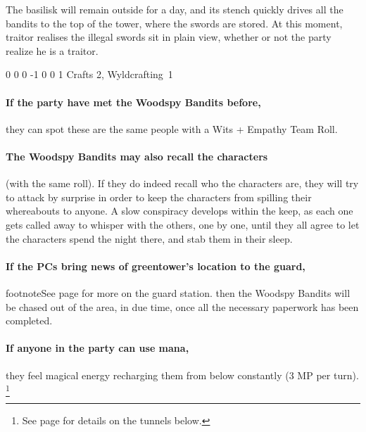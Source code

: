 \begin{multicols}{2}
The basilisk will remain outside for a day, and its stench quickly drives all the bandits to the top of the tower, where the swords are stored.
At this moment, \gls{traitor} realises the illegal swords sit in plain view, whether or not the party realize he is a traitor.

\label{traitor}
\traitor

{0}%
{0}%
{{0}%
{-1}%
{0}}%
{0}%
{1}%
{Crafts 2, Wyldcrafting~1}%
{\shortsword}%
{}

\basilisk

\paragraph{If the party have met the Woodspy Bandits before,}
they can spot these are the same people with a Wits + Empathy Team Roll.%

\paragraph{The Woodspy Bandits may also recall the characters}
(with the same roll).
If they do indeed recall who the characters are, they will try to attack by surprise in order to keep the characters from spilling their whereabouts to anyone.
A slow conspiracy develops within the keep, as each one gets called away to whisper with the others, one by one, until they all agree to let the characters spend the night there, and stab them in their sleep.

\paragraph{If the PCs bring news of \gls{greentower}'s location to the \gls{guard},}
footnote{See page \pageref{guardstation} for more on the guard station.}
then the Woodspy Bandits will be chased out of the area, in due time, once all the necessary paperwork has been completed.

\paragraph{If anyone in the party can use mana,}
they feel magical energy recharging them from below constantly (3 MP per turn).%
\footnote{See page \pageref{underGreenTower} for details on the tunnels below.}


\end{multicols}
